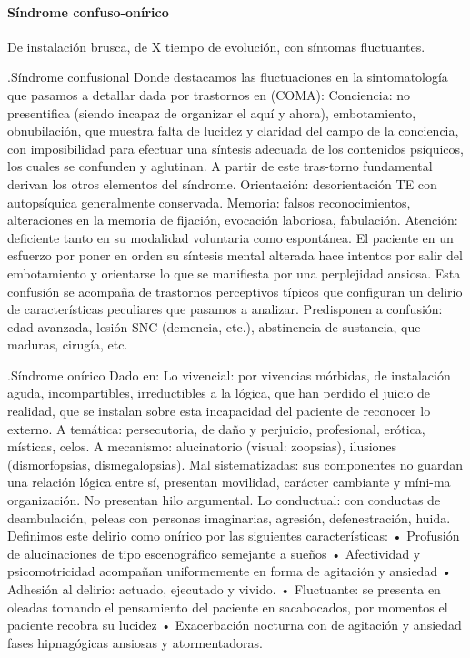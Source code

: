 \documentclass[encares.tex]{subfiles}
\begin{document}
\paragraph{Síndrome confuso-onírico}

De instalación brusca, de X tiempo de evolución, con síntomas fluctuantes.

.Síndrome confusional
Donde destacamos las fluctuaciones en la sintomatología que pasamos a detallar dada por trastornos en (COMA): Conciencia: no presentifica (siendo incapaz de organizar el aquí y ahora), embotamiento, obnubilación, que muestra falta de lucidez y claridad del campo de la conciencia, con imposibilidad para efectuar una síntesis adecuada de los contenidos psíquicos, los cuales se confunden y aglutinan. A partir de este tras-torno fundamental derivan los otros elementos del síndrome. Orientación: desorientación TE con autopsíquica generalmente conservada. Memoria: falsos reconocimientos, alteraciones en la memoria de fijación, evocación laboriosa, fabulación. Atención: deficiente tanto en su modalidad voluntaria como espontánea. El paciente en un esfuerzo por poner en orden su síntesis mental alterada hace intentos por salir del embotamiento y orientarse lo que se manifiesta por una perplejidad ansiosa. Esta confusión se acompaña de trastornos perceptivos típicos que configuran un delirio de características peculiares que pasamos a analizar. Predisponen a confusión: edad avanzada, lesión SNC (demencia, etc.), abstinencia de sustancia, que-maduras, cirugía, etc.

.Síndrome onírico
Dado en: Lo vivencial: por vivencias mórbidas, de instalación aguda, incompartibles, irreductibles a la lógica, que han perdido el juicio de realidad, que se instalan sobre esta incapacidad del paciente de reconocer lo externo. A temática: persecutoria, de daño y perjuicio, profesional, erótica, místicas, celos. A mecanismo: alucinatorio (visual: zoopsias), ilusiones (dismorfopsias, dismegalopsias). Mal sistematizadas: sus componentes no guardan una relación lógica entre sí, presentan movilidad, carácter cambiante y míni-ma organización. No presentan hilo argumental. Lo conductual: con conductas de deambulación, peleas con personas imaginarias, agresión, defenestración, huida. Definimos este delirio como onírico por las siguientes características: • Profusión de alucinaciones de tipo escenográfico semejante a sueños • Afectividad y psicomotricidad acompañan uniformemente en forma de agitación y ansiedad • Adhesión al delirio: actuado, ejecutado y vivido. • Fluctuante: se presenta en oleadas tomando el pensamiento del paciente en sacabocados, por momentos el paciente recobra su lucidez • Exacerbación nocturna con de agitación y ansiedad fases hipnagógicas ansiosas y atormentadoras.
\end{document}
